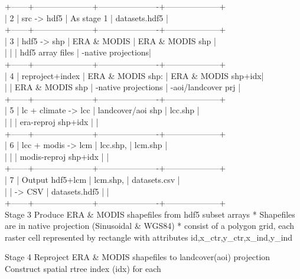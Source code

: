 \documentclass[twoside,a4paper]{refart}
\begin{document}
    +------+---------------------+----------------------+--------------------+\\
    | 2    | src -> hdf5         | As stage 1           | datasets.hdf5      |\\
    +------+---------------------+----------------------+--------------------+\\
    | 3    | hdf5 -> shp         | ERA \& MODIS          | ERA \& MODIS shp    |\\
    |      |                     | hdf5 array files     | -native projections|\\
    +------+---------------------+----------------------+--------------------+\\
    | 4    | reproject+index     | ERA \& MODIS shp:     | ERA \& MODIS shp+idx|\\
    |      | ERA \& MODIS shp     | -native projections  | -aoi/landcover prj |\\
    +------+---------------------+----------------------+--------------------+\\
    | 5    | lc + climate -> lcc | landcover/aoi shp    | lcc.shp            |\\
    |      |                     | era-reproj shp+idx   |                    |\\
    +------+---------------------+----------------------+--------------------+\\
    | 6    | lcc + modis -> lcm  | lcc.shp,             | lcm.shp            |\\
    |      |                     | modis-reproj shp+idx |                    |\\
    +------+---------------------+----------------------+--------------------+\\
    | 7    |  Output hdf5+lcm    | lcm.shp,             | datasets.csv       |\\
    |      |  -> CSV             | datasets.hdf5        |                    |\\
    +------+---------------------+----------------------+--------------------+\\


      Stage 3
        Produce ERA \& MODIS shapefiles from hdf5 subset arrays
        * Shapefiles are in native projection (Sinusoidal \& WGS84)
        * consist of a polygon grid, each raster cell represented by
          rectangle with attributes id,x\_ctr,y\_ctr,x\_ind,y\_ind

      Stage 4
        Reproject ERA \& MODIS shapefiles to landcover(aoi) projection
        Construct spatial rtree index (idx) for each
\end{document}
